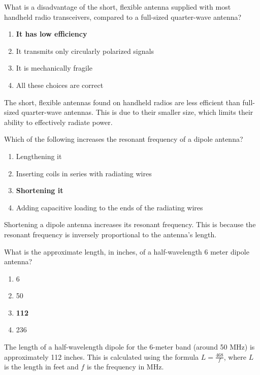 \begin{tcolorbox}[colback=gray!10!white,colframe=black!75!black,title={T9A04}]
    What is a disadvantage of the short, flexible antenna supplied with most handheld radio transceivers, compared to a full-sized quarter-wave antenna?
    \begin{enumerate}[label=\Alph*),noitemsep]
        \item \textbf{It has low efficiency}
        \item It transmits only circularly polarized signals
        \item It is mechanically fragile
        \item All these choices are correct
    \end{enumerate}
\end{tcolorbox}
The short, flexible antennas found on handheld radios are less efficient than full-sized quarter-wave antennas. This is due to their smaller size, which limits their ability to effectively radiate power.

\begin{tcolorbox}[colback=gray!10!white,colframe=black!75!black,title={T9A05}]
    Which of the following increases the resonant frequency of a dipole antenna?
    \begin{enumerate}[label=\Alph*),noitemsep]
        \item Lengthening it
        \item Inserting coils in series with radiating wires
        \item \textbf{Shortening it}
        \item Adding capacitive loading to the ends of the radiating wires
    \end{enumerate}
\end{tcolorbox}
Shortening a dipole antenna increases its resonant frequency. This is because the resonant frequency is inversely proportional to the antenna's length.

\begin{tcolorbox}[colback=gray!10!white,colframe=black!75!black,title={T9A09}]
    What is the approximate length, in inches, of a half-wavelength 6 meter dipole antenna?
    \begin{enumerate}[label=\Alph*),noitemsep]
        \item 6
        \item 50
        \item \textbf{112}
        \item 236
    \end{enumerate}
\end{tcolorbox}
The length of a half-wavelength dipole for the 6-meter band (around 50 MHz) is approximately 112 inches. This is calculated using the formula \( L = \frac{468}{f} \), where \( L \) is the length in feet and \( f \) is the frequency in MHz.

